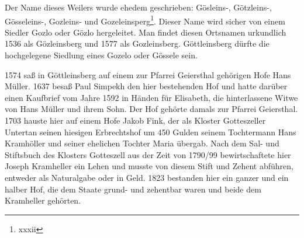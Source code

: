 \documentclass{book}
\begin{document}
Der Name dieses Weilers wurde ehedem geschrieben: Gösleins-, Götzleins-,
Gösseleins-, Gozleins- und Gozeleinsperg\footnote{xxxii}. Dieser Name
wird sicher von einem Siedler Gozlo oder Gözlo hergeleitet. Man findet
diesen Ortsnamen urkundlich 1536 als Gözleinsberg und 1577 als
Gozleinsberg. Göttleinsberg dürfte die hochgelegene Siedlung eines
Gozelo oder Gössele sein.

1574 saß in Göttleinsberg auf einem zur Pfarrei Geiersthal gehörigen
Hofe Hans Müller. 1637 besaß Paul Simpekh den hier bestehenden Hof und
hatte darüber einen Kaufbrief vom Jahre 1592 in Händen für Elisabeth,
die hinterlassene Witwe von Hans Müller und ihrem Sohn. Der Hof gehörte
damals zur Pfarrei Geiersthal. 1703 hauste hier auf einem Hofe Jakob
Fink, der als Kloster Gotteszeller Untertan seinen hiesigen Erbrechtshof
um 450 Gulden seinem Tochtermann Hans Kramhöller und seiner ehelichen
Tochter Maria übergab. Nach dem Sal- und Stiftsbuch des Klosters
Gotteszell aus der Zeit von 1790/99 bewirtschaftete hier Joseph
Kramheller ein Lehen und musste von diesem Stift und Zehent abführen,
entweder als Naturalgabe oder in Geld. 1823 bestanden hier ein ganzer
und ein halber Hof, die dem Staate grund- und zehentbar waren und beide
dem Kramheller gehörten.
\end{document}

